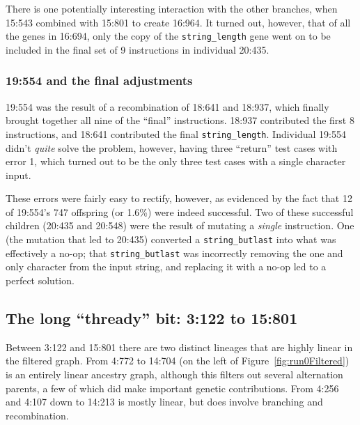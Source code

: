 There is one potentially interesting interaction with the other branches, 
when 15:543 combined with 15:801 to create 16:964. It turned out, however,
that of all the genes in 16:694, only the copy of the \texttt{string\_length} 
gene went on to be included in the final set of 9 instructions in individual 
20:435.

\subsubsection{19:554 and the final adjustments}


19:554 was the result of a recombination of 18:641 and 18:937, which finally
brought together all nine of the ``final'' instructions. 18:937 contributed
the first 8 instructions, and 18:641 contributed the final 
\texttt{string\_length}. Individual 19:554 didn't \emph{quite} solve the
problem, however, having three ``return'' test cases with error 1, which turned
out to be the only three test cases with a single character input.

These errors were fairly easy to rectify, however, as evidenced by the 
fact that 12 of 19:554's 747 offspring (or 1.6\%) were indeed successful.
Two of these successful children (20:435 and 20:548) were the result of 
mutating a \emph{single} instruction. One (the mutation that led to 20:435) 
converted a \texttt{string\_butlast} into what was effectively a no-op; that
\texttt{string\_butlast} was incorrectly removing the one and only character
from the input string, and replacing it with a no-op led to a perfect solution.

\subsection{The long ``thready'' bit: 3:122 to 15:801}


Between 3:122 and 15:801 there are two distinct lineages that are highly
linear in the filtered graph. From 4:772 to 14:704 (on the left of
Figure~\ref{fig:run0Filtered}) is an entirely linear ancestry graph, although
this filters out several alternation parents, a few of which did make
important genetic contributions. From 4:256 and 4:107 down to 14:213 is
mostly linear, but does involve branching and recombination.

